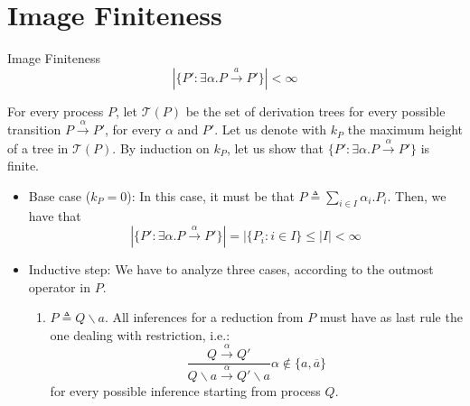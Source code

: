 \section{Image Finiteness}
\begin{Thm}{Image Finiteness}{}
    \begin{equation*}
        |\{P':\exists\alpha.P\xrightarrow{a}P'\}|<\infty
    \end{equation*}

\begin{demonstration}
    For every process $P$, let $\mathcal{T}(P)$ be the set of derivation trees for every possible transition $P\xrightarrow{\alpha}P'$, for every $\alpha$ and $P'$. Let us denote with $k_P$ the maximum height of a tree in $\mathcal{T}(P)$. By induction on $k_P$, let us show that $\{P': \exists \alpha.P\xrightarrow{\alpha}P'\}$ is finite.

    \begin{itemize}
        \item Base case ($k_P = 0$): In this case, it must be that $P\triangleq\sum_{i\in I}\alpha_i.P_i$. Then, we have that
        \begin{equation*}
            |\{P':\exists\alpha.P\xrightarrow{\alpha}P'\}| = |\{P_i:i\in I\}\leq |I|<\infty
        \end{equation*}
        \item Inductive step: We have to analyze three cases, according to the outmost operator in $P$.
        \begin{enumerate}
            \item $P\triangleq Q\backslash a$. All inferences for a reduction from $P$ must have as last rule the one dealing with restriction, i.e.:
            \begin{equation*}
                \frac{Q\xrightarrow{\alpha}Q'}{Q\backslash a\xrightarrow{\alpha}Q'\backslash a}\alpha\notin\{a, \overline{a}\}
            \end{equation*}
            for every possible inference starting from process $Q$.


\end{enumerate}
\end{itemize}
\end{demonstration}
\end{Thm}
